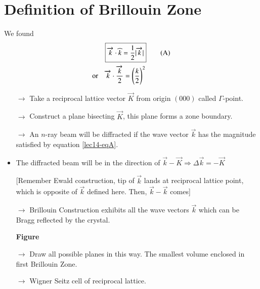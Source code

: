 \section*{Definition of Brillouin Zone}

We found
\begin{align*}
&\fbox{$\overrightarrow{k}\cdot \widehat{k}=\dfrac{1}{2}|\overrightarrow{k}|$}\tag{A}\label{lec14-eqA}\\
\text{or}\quad & \overrightarrow{k}\cdot \dfrac{\overrightarrow{k}}{2}=\left(\dfrac{k}{2}\right)^{2}
\end{align*}
\begin{itemize}
\item[$\to$] Take a reciprocal lattice vector $\overrightarrow{K}$ from origin $(000)$ called $\Gamma$-point.

\item[$\to$] Construct a plane bisecting $\overrightarrow{K}$, this plane forms a zone boundary.

\item[$\to$] An $n$-ray beam will be diffracted if the wave vector $\overrightarrow{k}$ has the magnitude satisfied by equation \eqref{lec14-eqA}.

\item The diffracted beam will be in the direction of $\overrightarrow{k}-\overrightarrow{K}\Rightarrow \Delta \overrightarrow{k}=-\overrightarrow{K}$

[Remember Ewald construction, tip of $\overrightarrow{k}$ lands at reciprocal lattice point, which is opposite of $\overrightarrow{k}$ defined here. Then, $\overrightarrow{k}-\overrightarrow{k}$ comes]

\item[$\to$] Brillouin Construction exhibits all the wave vectors $\overrightarrow{k}$ which can be Bragg reflected by the crystal.
\begin{center}
{\bf Figure}
\end{center}

\item[$\to$] Draw all possible planes in this way. The smallest volume enclosed in first Brillouin Zone.

\item[$\to$] Wigner Seitz cell of reciprocal lattice.
\end{itemize}

